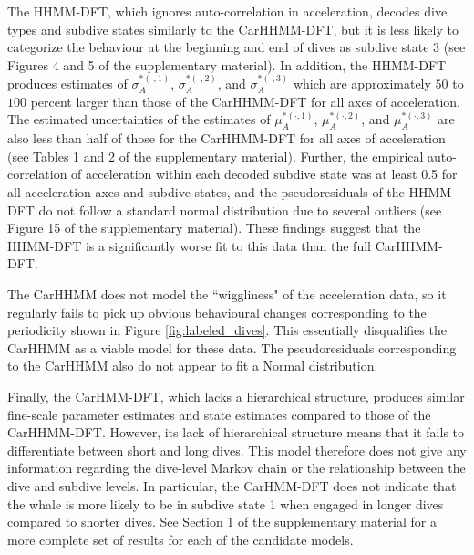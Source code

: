 The HHMM-DFT, which ignores auto-correlation in acceleration, decodes dive types and subdive states similarly to the CarHHMM-DFT, but it is less likely to categorize the behaviour at the beginning and end of dives as subdive state 3 (see Figures 4 and 5 of the supplementary material). In addition, the HHMM-DFT produces estimates of $\sigma_A^{*(\cdot,1)}$, $\sigma_A^{*(\cdot,2)}$, and $\sigma_A^{*(\cdot,3)}$ which are approximately $50$ to $100$ percent larger than those of the CarHHMM-DFT for all axes of acceleration. The estimated uncertainties of the estimates of $\mu_A^{*(\cdot,1)}$, $\mu_A^{*(\cdot,2)}$, and $\mu_A^{*(\cdot,3)}$ are also less than half of those for the CarHHMM-DFT for all axes of acceleration (see Tables 1 and 2 of the supplementary material). Further, the empirical auto-correlation of acceleration within each decoded subdive state was at least 0.5 for all acceleration axes and subdive states, and the pseudoresiduals of the HHMM-DFT do not follow a standard normal distribution due to several outliers (see Figure 15 of the supplementary material). These findings suggest that the HHMM-DFT is a significantly worse fit to this data than the full CarHHMM-DFT.

The CarHHMM does not model the ``wiggliness" of the acceleration data, so it regularly fails to pick up obvious behavioural changes corresponding to the periodicity shown in Figure \ref{fig:labeled_dives}. This essentially disqualifies the CarHHMM as a viable model for these data. The pseudoresiduals corresponding to the CarHHMM also do not appear to fit a Normal distribution.

Finally, the CarHMM-DFT, which lacks a hierarchical structure, produces similar fine-scale parameter estimates and state estimates compared to those of the CarHHMM-DFT. However, its lack of hierarchical structure means that it fails to differentiate between short and long dives. This model therefore does not give any information regarding the dive-level Markov chain or the relationship between the dive and subdive levels. In particular, the CarHMM-DFT does not indicate that the whale is more likely to be in subdive state 1 when engaged in longer dives compared to shorter dives. See Section 1 of the supplementary material for a more complete set of results for each of the candidate models.